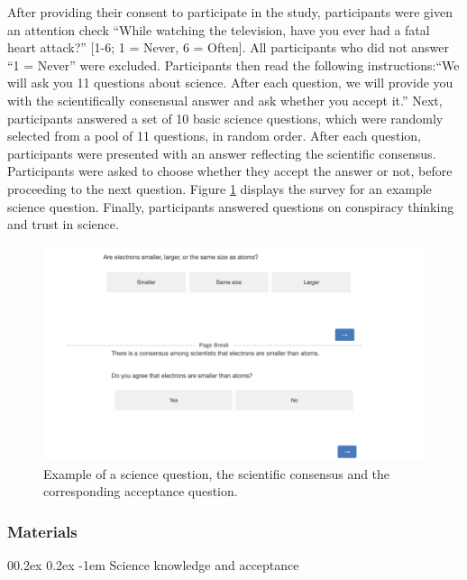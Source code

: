 \documentclass[
  doc,floatsintext]{apa6}
\makeatletter
\let\oldparagraph\paragraph
\renewcommand{\paragraph}[1]{\oldparagraph{#1}\mbox{}}
\renewcommand{\paragraph}{\@startsection{paragraph}{4}{\parindent}%
  {0\baselineskip \@plus 0.2ex \@minus 0.2ex}%
  {-1em}%
  {\normalfont\normalsize\bfseries\itshape\typesectitle}}
\makeatother
\begin{document}
After providing their consent to participate in the study, participants were given an attention check ``While watching the television, have you ever had a fatal heart attack?'' {[}1-6; 1 = Never, 6 = Often{]}. All participants who did not answer ``1 = Never'' were excluded. Participants then read the following instructions:``We will ask you 11 questions about science. After each question, we will provide you with the scientifically consensual answer and ask whether you accept it.'' Next, participants answered a set of 10 basic science questions, which were randomly selected from a pool of 11 questions, in random order. After each question, participants were presented with an answer reflecting the scientific consensus. Participants were asked to choose whether they accept the answer or not, before proceeding to the next question. Figure \ref{fig:stimulus-example} displays the survey for an example science question. Finally, participants answered questions on conspiracy thinking and trust in science.



\begin{figure}

\includegraphics[width=1\linewidth]{./figures/study1_question_example} \hfill{}

\caption{Example of a science question, the scientific consensus and the corresponding acceptance question.}\label{fig:stimulus-example}
\end{figure}

\hypertarget{materials}{%
\subsubsection{Materials}\label{materials}}

\hypertarget{science-knowledge-and-acceptance}{%
\paragraph{Science knowledge and acceptance}\label{science-knowledge-and-acceptance}}
\end{document}
